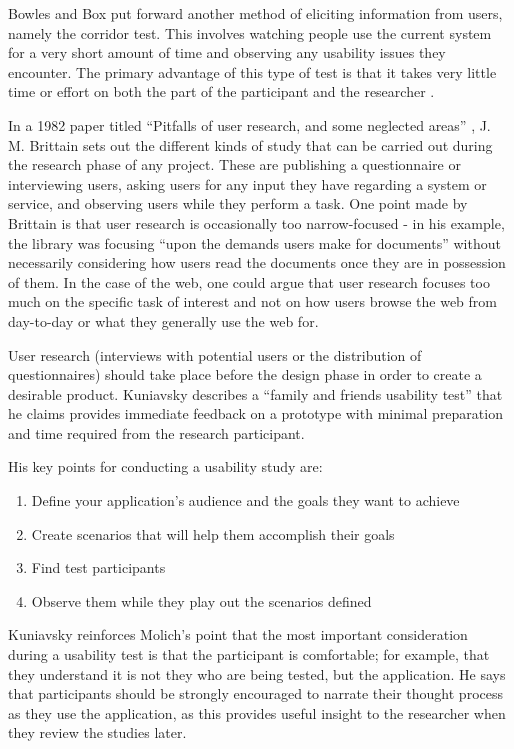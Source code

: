 \documentclass[]{scrartcl}
\begin{document}
Bowles and Box put forward another method of eliciting information from users,
namely the corridor test. This involves watching people use the current system
for a very short amount of time and observing any usability issues they
encounter. The primary advantage of this type of test is that it takes very
little time or effort on both the part of the participant and the researcher
\cite{bowles2011undercover}.

In a 1982 paper titled ``Pitfalls of user research, and some neglected areas''
\cite{brittain1982pitfalls}, J. M. Brittain sets out the different kinds of
study that can be carried out during the research phase of any project. These
are publishing a questionnaire or interviewing users, asking users for any
input they have regarding a system or service, and observing users while they
perform a task. One point made by Brittain is that user research is
occasionally too narrow-focused - in his example, the library was focusing
``upon the demands users make for documents'' without necessarily considering
how users read the documents once they are in possession of them. In the case
of the web, one could argue that user research focuses too much on the
specific task of interest and not on how users browse the web from day-to-day
or what they generally use the web for.

User research (interviews with potential users or the distribution of
questionnaires) should take place before the design phase in order to create a
desirable product. Kuniavsky \cite{kuniavsky2003userexperience} describes a
``family and friends usability test'' that he claims provides immediate
feedback on a prototype with minimal preparation and time required from the
research participant.

His key points for conducting a usability study are:

\begin{enumerate}
  \item Define your application's audience and the goals they want to achieve
  \item Create scenarios that will help them accomplish their goals
  \item Find test participants
  \item Observe them while they play out the scenarios defined
\end{enumerate}

Kuniavsky reinforces Molich's point that the most important consideration
during a usability test is that the participant is comfortable; for example,
that they understand it is not they who are being tested, but the application.
He says that participants should be strongly encouraged to narrate their
thought process as they use the application, as this provides useful insight
to the researcher when they review the studies later.
\end{document}
